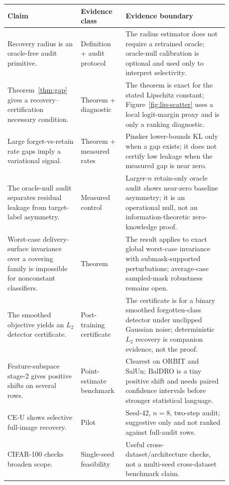 \documentclass{article}
\begin{document}
\begin{table}[t]
  \centering
  \small
  \setlength{\tabcolsep}{4pt}
  \begin{tabular}{p{0.28\linewidth} p{0.18\linewidth} p{0.42\linewidth}}
    \toprule
    Claim & Evidence class & Evidence boundary \\
    \midrule
    Recovery radius is an oracle-free audit primitive. & Definition + audit protocol & The radius estimator does not require a retrained oracle; oracle-null calibration is optional and used only to interpret selectivity. \\
    Theorem~\ref{thm:gap} gives a recovery--certification necessary condition. & Theorem + diagnostic & The theorem is exact for the stated Lipschitz constant; Figure~\ref{fig:lip-scatter} uses a local logit-margin proxy and is only a ranking diagnostic. \\
    Large forget-vs-retain rate gaps imply a variational signal. & Theorem + measured rates & Pinsker lower-bounds KL only when a gap exists; it does not certify low leakage when the measured gap is near zero. \\
    The oracle-null audit separates residual leakage from target-label asymmetry. & Measured control & Larger-$n$ retain-only oracle audit shows near-zero baseline asymmetry; it is an operational null, not an information-theoretic zero-knowledge proof. \\
    Worst-case delivery-surface invariance over a covering family is impossible for nonconstant classifiers. & Theorem & The result applies to exact global worst-case invariance with submask-supported perturbations; average-case sampled-mask robustness remains open. \\
    The smoothed objective yields an $L_2$ detector certificate. & Post-training certificate & The certificate is for a binary smoothed forgotten-class detector under unclipped Gaussian noise; deterministic $L_2$ recovery is companion evidence, not the proof. \\
    Feature-subspace stage-2 gives positive shifts on several rows. & Point-estimate benchmark & Clearest on ORBIT and SalUn; BalDRO is a tiny positive shift and needs paired confidence intervals before stronger statistical language. \\
    CE-U shows selective full-image recovery. & Pilot & Seed-42, $n=8$, two-step audit; suggestive only and not ranked against full-audit rows. \\
    CIFAR-100 checks broaden scope. & Single-seed feasibility & Useful cross-dataset/architecture checks, not a multi-seed cross-dataset benchmark claim. \\

\end{tabular}
\end{table}
\end{document}

